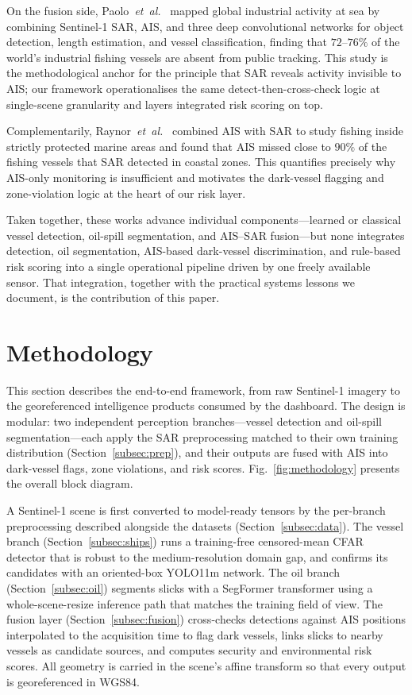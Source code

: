 \documentclass{ieeeaccess}
\begin{document}
On the fusion side, Paolo~\textit{et~al.}~\cite{3} mapped global industrial activity at sea by combining Sentinel-1 SAR, AIS, and three deep convolutional networks for object detection, length estimation, and vessel classification, finding that $72$--$76\%$ of the world's industrial fishing vessels are absent from public tracking. This study is the methodological anchor for the principle that SAR reveals activity invisible to AIS; our framework operationalises the same detect-then-cross-check logic at single-scene granularity and layers integrated risk scoring on top.

Complementarily, Raynor~\textit{et~al.}~\cite{2} combined AIS with SAR to study fishing inside strictly protected marine areas and found that AIS missed close to $90\%$ of the fishing vessels that SAR detected in coastal zones. This quantifies precisely why AIS-only monitoring is insufficient and motivates the dark-vessel flagging and zone-violation logic at the heart of our risk layer.

Taken together, these works advance individual components---learned or classical vessel detection, oil-spill segmentation, and AIS--SAR fusion---but none integrates detection, oil segmentation, AIS-based dark-vessel discrimination, and rule-based risk scoring into a single operational pipeline driven by one freely available sensor. That integration, together with the practical systems lessons we document, is the contribution of this paper.

\section{Methodology}

This section describes the end-to-end framework, from raw Sentinel-1 imagery to the georeferenced intelligence products consumed by the dashboard. The design is modular: two independent perception branches---vessel detection and oil-spill segmentation---each apply the SAR preprocessing matched to their own training distribution (Section~\ref{subsec:prep}), and their outputs are fused with AIS into dark-vessel flags, zone violations, and risk scores. Fig.~\ref{fig:methodology} presents the overall block diagram.

A Sentinel-1 scene is first converted to model-ready tensors by the per-branch preprocessing described alongside the datasets (Section~\ref{subsec:data}). The vessel branch (Section~\ref{subsec:ships}) runs a training-free censored-mean CFAR detector that is robust to the medium-resolution domain gap, and confirms its candidates with an oriented-box YOLO11m network. The oil branch (Section~\ref{subsec:oil}) segments slicks with a SegFormer transformer using a whole-scene-resize inference path that matches the training field of view. The fusion layer (Section~\ref{subsec:fusion}) cross-checks detections against AIS positions interpolated to the acquisition time to flag dark vessels, links slicks to nearby vessels as candidate sources, and computes security and environmental risk scores. All geometry is carried in the scene's affine transform so that every output is georeferenced in WGS84.
\end{document}
